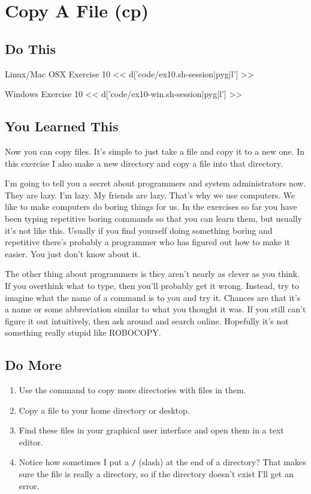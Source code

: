 \chapter{Copy A File (cp)}

\section{Do This}

\begin{code}{Linux/Mac OSX Exercise 10}
<< d['code/ex10.sh-session|pyg|l'] >>
\end{code}

\begin{code}{Windows Exercise 10}
<< d['code/ex10-win.sh-session|pyg|l'] >>
\end{code}

\section{You Learned This}

Now you can copy files.  It's simple to just take a file and copy it to a new
one.  In this exercise I also make a new directory and copy a file into that
directory.

I'm going to tell you a secret about programmers and system administrators now.
They are lazy.  I'm lazy.  My friends are lazy.  That's why we use computers.
We like to make computers do boring things for us.  In the exercises so far
you have been typing repetitive boring commands so that you can learn them,
but usually it's not like this.  Usually if you find yourself doing something
boring and repetitive there's probably a programmer who has figured out
how to make it easier. You just don't know about it.

The other thing about programmers is they aren't nearly as clever as you think.
If you overthink what to type, then you'll probably get it wrong.  Instead, try
to imagine what the name of a command is to you and try it.  Chances are that
it's a name or some abbreviation similar to what you thought it was.  If you still can't figure it out intuitively,
then ask around and search online. Hopefully it's not something really stupid like ROBOCOPY.


\section{Do More}

\begin{enumerate}
\item Use the  command to copy more directories with files in them.
\item Copy a file to your home directory or desktop.
\item Find these files in your graphical user interface and open them
    in a text editor.
\item Notice how sometimes I put a \verb|/| (slash) at the end of a directory? That
makes sure the file is really a directory, so if the directory doesn't exist I'll 
get an error.
\end{enumerate}

